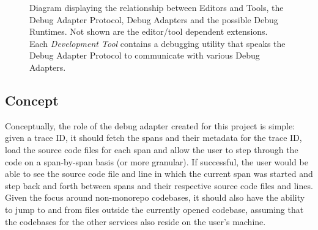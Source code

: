 \documentclass[12pt,pdftex,titlepage]{report}
\begin{document}
                \begin{figure}[hbt!]
                    \centering
                    \caption[The relationships in the Debug Adapter Protocol]{Diagram displaying the relationship between Editors and Tools, the Debug Adapter Protocol, Debug Adapters and the possible Debug Runtimes.
                        Not shown are the editor/tool dependent extensions. Each \textit{Development Tool} contains a debugging utility that speaks the Debug Adapter Protocol to communicate with various Debug
                        Adapters.}
                    \label{fig:debug-arch}
                \end{figure}

            \subsection{Concept}
                Conceptually, the role of the debug adapter created for this project is simple: given a trace ID, it should fetch the spans and their metadata for the trace ID, load the 
                source code files for each span and allow the user to step through the code on a span-by-span basis (or more granular). If successful, the user would be able to see the
                source code file and line in which the current span was started and step back and forth between spans and their respective source code files and lines. Given the focus
                around non-monorepo codebases, it should also have the ability to jump to and from files outside the currently opened codebase, assuming that the codebases for the other 
                services also reside on the user's machine.
                
\end{document}
